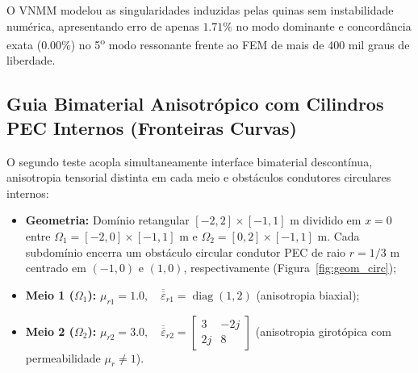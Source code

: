 \documentclass[11pt,a4paper]{article}
\begin{document}
\begin{table}[H]
\centering
\caption{Compara\c{c}\~ao dos primeiros 5 autovalores no guia com sali\^encia em ``H'' entre o VNMM 2D e o FEM de aresta de alta densidade (427.492 arestas).}
\label{tab:hguide}
\end{table}

O VNMM modelou as singularidades induzidas pelas quinas sem instabilidade num\'erica, apresentando erro de apenas $1.71\%$ no modo dominante e concord\^ancia exata ($0.00\%$) no 5\textsuperscript{o} modo ressonante frente ao FEM de mais de 400 mil graus de liberdade.

\subsection{Guia Bimaterial Anisotr\'opico com Cilindros PEC Internos (Fronteiras Curvas)}
O segundo teste acopla simultaneamente interface bimaterial descont\'inua, anisotropia tensorial distinta em cada meio e obst\'aculos condutores circulares internos:
\begin{itemize}
  \item \textbf{Geometria:} Dom\'inio retangular $[-2, 2] \times [-1, 1]\text{ m}$ dividido em $x = 0$ entre $\Omega_1 = [-2, 0] \times [-1, 1]\text{ m}$ e $\Omega_2 = [0, 2] \times [-1, 1]\text{ m}$. Cada subdom\'inio encerra um obst\'aculo circular condutor PEC de raio $r = 1/3\text{ m}$ centrado em $(-1, 0)$ e $(1, 0)$, respectivamente (Figura~\ref{fig:geom_circ});
  \item \textbf{Meio 1 ($\Omega_1$):} $\mu_{r1} = 1.0, \quad \overline{\overline{\varepsilon}}_{r1} = \operatorname{diag}(1, 2)$ (anisotropia biaxial);
  \item \textbf{Meio 2 ($\Omega_2$):} $\mu_{r2} = 3.0, \quad \overline{\overline{\varepsilon}}_{r2} = \begin{bmatrix} 3 & -2j \\ 2j & 8 \end{bmatrix}$ (anisotropia girot\'opica com permeabilidade $\mu_r \neq 1$).
\end{itemize}
\end{document}
